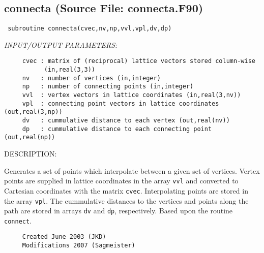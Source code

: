 \documentclass[11pt]{article}
\begin{document}
\subsection{connecta (Source File: connecta.F90)}


\begin{verbatim} subroutine connecta(cvec,nv,np,vvl,vpl,dv,dp)\end{verbatim}{\em INPUT/OUTPUT PARAMETERS:}
\begin{verbatim}     cvec : matrix of (reciprocal) lattice vectors stored column-wise
           (in,real(3,3))
     nv   : number of vertices (in,integer)
     np   : number of connecting points (in,integer)
     vvl  : vertex vectors in lattice coordinates (in,real(3,nv))
     vpl  : connecting point vectors in lattice coordinates (out,real(3,np))
     dv   : cummulative distance to each vertex (out,real(nv))
     dp   : cummulative distance to each connecting point (out,real(np))\end{verbatim}
{\sf DESCRIPTION:\\ }


     Generates a set of points which interpolate between a given set of vertices.
     Vertex points are supplied in lattice coordinates in the array {\tt vvl} and
     converted to Cartesian coordinates with the matrix {\tt cvec}. Interpolating
     points are stored in the array {\tt vpl}. The cummulative distances to the
     vertices and points along the path are stored in arrays {\tt dv} and
     {\tt dp}, respectively. Based upon the routine {\tt connect}.
  
\begin{verbatim}     Created June 2003 (JKD)
     Modifications 2007 (Sagmeister)\end{verbatim}











\end{document}
